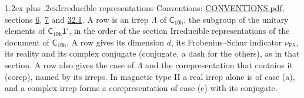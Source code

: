 \documentclass[10pt,a4paper]{article}
\makeatletter
\renewcommand\section{\@startsection{section}{1}{\z@}{-3ex plus -1ex minus -.2ex}%
  {1.2ex plus .2ex}{\normalfont\large\sffamily\bfseries\color{parttitle}}}
\numberwithin{equation}{section}
\newcommand{\grp}[1]{\mathsf{#1}}
\newcommand{\fsind}{\nu_{\mathrm{FS}}}
\makeatother
\begin{document}
\section{Irreducible representations}\label{s:irreps}
Conventions: \href{../../CONVENTIONS.pdf}{CONVENTIONS.pdf}, sections \href{../../../rotation/CONVENTIONS.pdf\#conv.6}{6}, \href{../../../rotation/CONVENTIONS.pdf\#conv.7}{7} and \href{../../CONVENTIONS.pdf\#conv.32.1}{32.1}.
\leavevmode\label{n:irrep.Delta}A row is an irrep $\Lambda$ of $\grp{C_{10h}}$, the subgroup of the unitary elements of $\grp{C_{10h}1'}$, in the order of the section Irreducible representations of the document of \href{../../../rotation/data/pdf/C10h.pdf}{$\grp{C_{10h}}$}. \label{n:index.dimension}\label{n:index.frobenius}\label{n:head.irrep}\label{n:head.reality}\label{n:head.conjugate}A row gives its dimension $d$, its Frobenius--Schur indicator $\fsind$, its reality and its complex conjugate (conjugate, a dash for the others), as in that section. \label{n:head.case.corep}\label{n:head.corep}A row also gives the case of $\Lambda$ and the corepresentation that contains it (corep), named by its irreps. In magnetic type II a real irrep alone is of case (a), and a complex irrep forms a corepresentation of case (c) with its conjugate.
\setlength{\emergencystretch}{2em}\par\setlength{\emergencystretch}{0pt}
\end{document}

